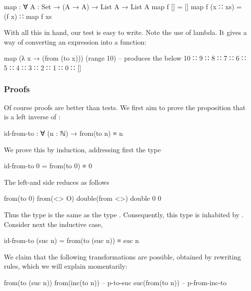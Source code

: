 \begin{colored}[elm]
map : ∀ {A : Set} → (A → A) → List A → List A
map f [] = []
map f (x ∷ xs) = (f x) ∷ map f xs
\end{colored}

With all this in hand, our test is easy to write.  Note the use of lambda.  It gives a way of converting an expression into a function:

\begin{colored}[elm]
map (λ x → (from (to x))) (range 10)
-- produces the below
10 ∷ 9 ∷ 8 ∷ 7 ∷ 6 ∷ 5 ∷ 4 ∷ 3 ∷ 2 ∷ 1 ∷ 0 ∷ []
\end{colored}

\subsubsection{Proofs}

Of course proofs are better than tests.  We first aim to prove the proposition that  is a left inverse of :

\begin{colored}[elm]
id-from-to : ∀ (n : ℕ) → from(to n) ≡ n
\end{colored}

We prove this by induction, addressing first the type

\begin{colored}[elm]
id-from-to 0 = from(to 0) ≡ 0
\end{colored}

The left-and side reduces as follows

\begin{colored}[elm]
from(to 0)
from(<> O)
double(from <>)
double 0
0
\end{colored}

Thus the type  is the same as the type .  Consequently, this type is inhabited by . Consider next the inductive case,

\begin{colored}[elm]
id-from-to (suc n) = from(to (suc n)) ≡ suc n
\end{colored}

We claim that the following transformations are possible, obtained by rewriting rules, which we will explain momentarily:

\begin{colored}[elm]
from(to (suc n))
from(inc(to n))  -- p-to-suc
suc(from(to n))  -- p-from-inc-to
\end{colored}

